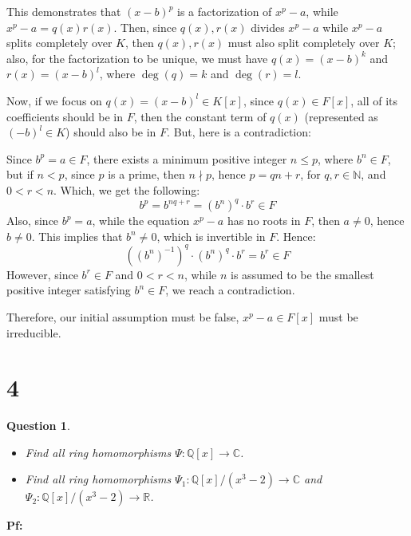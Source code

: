 \documentclass{article}
\newtheorem{question}{Question}
\begin{document}
This demonstrates that $(x-b)^p$ is a factorization of $x^p-a$, while $x^p-a=q(x)r(x)$. Then, since $q(x),r(x)$ divides $x^p-a$ while $x^p-a$ splits completely over $K$, then $q(x),r(x)$ must also split completely over $K$; 
also, for the factorization to be unique, we must have $q(x)=(x-b)^k$ and $r(x)=(x-b)^l$, where $\deg(q)=k$ and $\deg(r)=l$.

\hfil

Now, if we focus on $q(x)=(x-b)^l\in K[x]$, since $q(x)\in F[x]$, all of its coefficients should be in $F$, then the constant term of $q(x)$ (represented as $(-b)^l\in K$) should also be in $F$. But, here is a contradiction:

Since $b^p=a\in F$, there exists a minimum positive integer $n\leq p$, where $b^n\in F$, but if $n<p$, since $p$ is a prime, then $n\nmid p$, hence $p=qn+r$, for $q,r\in \mathbb{N}$, and $0<r<n$.
Which, we get the following:
$$b^p=b^{nq+r}=(b^n)^q\cdot b^r \in F$$
Also, since $b^p=a$, while the equation $x^p-a$ has no roots in $F$, then $a\neq 0$, hence $b\neq 0$. This implies that $b^n \neq 0$, which is invertible in $F$. Hence:
$$((b^n)^{-1})^q\cdot(b^n)^q\cdot b^r=b^r\in F$$
However, since $b^r\in F$ and $0<r<n$, while $n$ is assumed to be the smallest positive integer satisfying $b^n\in F$, we reach a contradiction.

Therefore, our initial assumption must be false, $x^p-a\in F[x]$ must be irreducible.



\break

\section*{4}
\begin{myBox}[]{}
    \begin{question}

        \hfil

        \begin{itemize}
            \item[(a)] Find all ring homomorphisms $\Psi:\mathbb{Q}[x]\rightarrow \mathbb{C}$.
            \item[(b)] Find all ring homomorphisms $\Psi_1:\mathbb{Q}[x]/(x^3-2)\rightarrow\mathbb{C}$ and $\Psi_2:\mathbb{Q}[x]/(x^3-2)\rightarrow\mathbb{R}$.
        \end{itemize}
    \end{question}
\end{myBox}

\textbf{Pf:}
\end{document}
